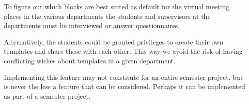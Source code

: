 To figure out which blocks are best suited as default for the virtual meeting places in the various departments the students and supervisors at the departments must be interviewed or answer questionnaires.

Alternatively, the students could be granted privileges to create their own templates and share these with each other.
This way we avoid the risk of having conflicting wishes about templates in a given department.

Implementing this feature may not constitute for an entire semester project, but is never the less a feature that can be considered.
Perhaps it can be implemented as part of a semester project.
